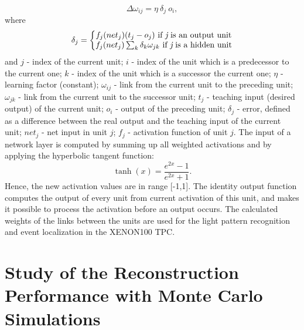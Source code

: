 \begin{equation}
\Delta\omega_{ij} = \eta\ \delta_{j}\ o_{i},
\end{equation}
where 
\begin{equation}
\nonumber
\delta_{j} = 
\left\{\begin{matrix}
f_{j}(net_{j})(t_{j}-o_{j})\ \text{if {\it j} is an output unit} \\
f_{j}(net_{j})\sum_{k}\delta_{k}\omega_{jk}\ \text{if {\it j} is a hidden unit}
\end{matrix}\right.
\end{equation}
and 
$j$ - index of the current unit; 
$i$ - index of the unit which is a predecessor to the current one; 
$k$ - index of the unit which is a successor the current one; 
$\eta$ - learning factor (constant); 
$\omega_{ij}$ - link from the current unit to the preceding unit; 
$\omega_{jk}$ - link from the current unit to the successor unit; 
$t_{j}$ - teaching input (desired output) of the current unit; 
$o_{i}$ - output of the preceding unit; 
$\delta_{j}$ - error, defined as a difference between the real output and the teaching input of the current unit; 
$net_{j}$ - net input in unit $j$; 
$f_{j}$ - activation function of unit $j$.
The input of a network layer is computed by summing up all weighted activations and by applying  the hyperbolic tangent function:
\begin{equation}
\tanh{(x)} = \frac{e^{2x}-1}{e^{2x}+1}.
\end{equation}
Hence, the new activation values are in range [-1,1]. The identity output function computes the output of every unit from current activation of this unit, and makes it possible to process the activation before an output occurs. 
The calculated weights of the links between the units are used for the light pattern recognition and event localization in the XENON100 TPC.
\\


\section{Study of the Reconstruction Performance with Monte Carlo Simulations}
\label{secNNmc}

